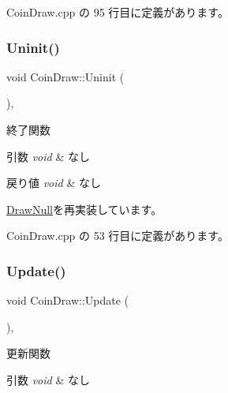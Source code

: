  Coin\+Draw.\+cpp の 95 行目に定義があります。

\mbox{\label{class_coin_draw_a6484c22a5598e298f18e7cd6083cd551}} 
\subsubsection{\texorpdfstring{Uninit()}{Uninit()}}
{\footnotesize\ttfamily void Coin\+Draw\+::\+Uninit (\begin{DoxyParamCaption}{ }\end{DoxyParamCaption})\hspace{0.3cm}{\ttfamily [override]}, {\ttfamily [virtual]}}



終了関数 


\begin{DoxyParams}{引数}
{\em void} & なし \\
\hline
\end{DoxyParams}

\begin{DoxyRetVals}{戻り値}
{\em void} & なし \\
\hline
\end{DoxyRetVals}


\mbox{\hyperlink{class_draw_null_a6e81d63efab7333e8d0e8af99362a4d9}{Draw\+Null}}を再実装しています。



 Coin\+Draw.\+cpp の 53 行目に定義があります。

\mbox{\label{class_coin_draw_a6157b17bf1706b85156aad0d88acfd7e}} 
\subsubsection{\texorpdfstring{Update()}{Update()}}
{\footnotesize\ttfamily void Coin\+Draw\+::\+Update (\begin{DoxyParamCaption}{ }\end{DoxyParamCaption})\hspace{0.3cm}{\ttfamily [override]}, {\ttfamily [virtual]}}



更新関数 


\begin{DoxyParams}{引数}
{\em void} & なし \\
\hline
\end{DoxyParams}

